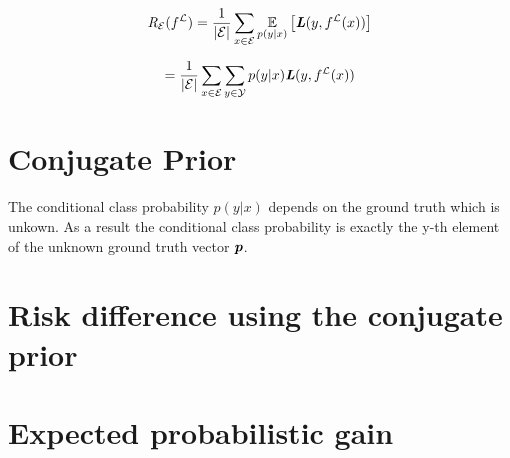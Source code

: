 \begin{equation}
\textit{R}_{\mathcal{E}}(f^{\mathcal{L}}) = \frac{1}{|\mathcal{E}|} \sum_{x \in \mathcal{E}} \underset{p(y|x)}{\mathbb{E}} \left[ \textbf{\textit{L}}(y,f^{\mathcal{L}}(x)) \right]
\end{equation}

\begin{equation}
= \frac{1}{|\mathcal{E}|} \sum_{x \in \mathcal{E}} \sum_{y \in \mathcal{Y}} p(y|x) \textbf{\textit{L}}(y,f^{\mathcal{L}}(x))
\end{equation}


\section{Conjugate Prior}

The conditional class probability $p(y|x)$ depends on the ground truth which is unkown. As a result the conditional class probability is exactly the y-th element of the unknown ground truth vector $\textit{\textbf{p}}$.


\section{Risk difference using the conjugate prior}


\section{Expected probabilistic gain}
